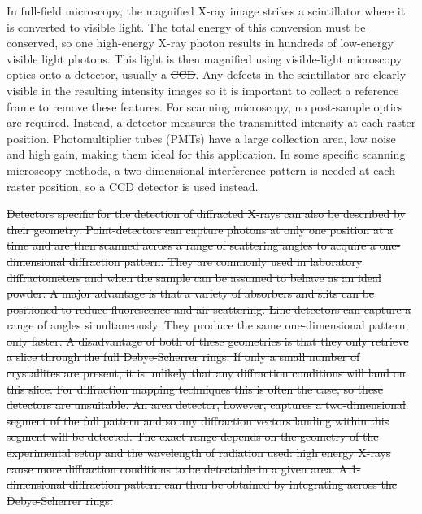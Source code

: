 \documentclass[journal=cmatex,manuscript=perspective]{achemso}
\providecommand{\DIFaddtex}[1]{{\protect\color{blue}\uwave{#1}}} %
\providecommand{\DIFdeltex}[1]{{\protect\color{red}\sout{#1}}}                      %
\providecommand{\DIFaddbegin}{} %
\providecommand{\DIFaddend}{} %
\providecommand{\DIFdelbegin}{} %
\providecommand{\DIFdelend}{} %
\providecommand{\DIFadd}[1]{\texorpdfstring{\DIFaddtex{#1}}{#1}} %
\providecommand{\DIFdel}[1]{\texorpdfstring{\DIFdeltex{#1}}{}} %
\begin{document}
\DIFdel{In }\DIFdelend full-field microscopy, the magnified X-ray image strikes a
scintillator where it is converted to visible light. The total energy
of this conversion must be conserved, so one high-energy X-ray photon
results in hundreds of low-energy visible light photons. This light is
then magnified using visible-light microscopy optics onto a detector,
usually a \DIFdelbegin \DIFdel{CCD}\DIFdelend \DIFaddbegin \DIFadd{charge-coupled device (CCD)}\DIFaddend . Any defects in the scintillator
are clearly visible in the resulting intensity images so it is
important to collect a reference frame to remove these features. For
scanning microscopy, no post-sample optics are required. Instead, a
detector measures the transmitted intensity at each raster
position. Photomultiplier tubes (PMTs) have a large collection area,
low noise and high gain, making them ideal for this application. In
some specific scanning microscopy methods, a two-dimensional
interference pattern is needed at each raster position, so a CCD
detector is used instead.

\DIFdelbegin \DIFdel{Detectors specific for the detection of diffracted X-rays can also be
described by their geometry. Point-detectors can capture photons at
only one position at a time and are then scanned across a range of
scattering angles to acquire a one-dimensional diffraction
pattern. They are commonly used in laboratory diffractometers and when
the sample can be assumed to behave as an ideal powder. A major
advantage is that a variety of absorbers and slits can be positioned
to reduce fluorescence and air scattering. Line-detectors can capture
a range of angles simultaneously. They produce the same
one-dimensional pattern, only faster. A disadvantage of both of these
geometries is that they only retrieve a slice through the full
Debye-Scherrer rings. If only a small number of crystallites are
present, it is unlikely that any diffraction conditions will land on
this slice. For diffraction mapping techniques this is often the case,
so these detectors are unsuitable. An area detector, however, captures
a two-dimensional segment of the full pattern and so any diffraction
vectors landing within this segment will be detected. The exact range
depends on the geometry of the experimental setup and the wavelength
of radiation used: high energy X-rays cause more diffraction
conditions to be detectable in a given area. A 1-dimensional
diffraction pattern can then be obtained by integrating across the
Debye-Scherrer rings.
}%
\end{document}
